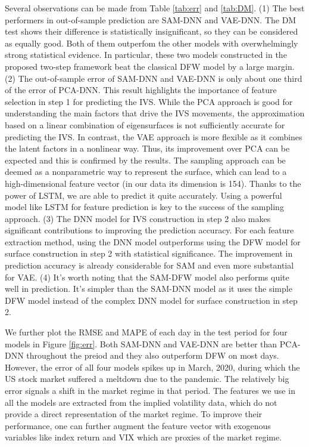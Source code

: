 \documentclass[11pt,a4paper]{article}
\theoremstyle{remark}
\begin{document}
Several observations can be made from Table \ref{tab:err} and \ref{tab:DM}. (1) The best performers in out-of-sample prediction are SAM-DNN and VAE-DNN. The DM test shows their difference is statistically insignificant, so they can be considered as equally good. Both of them outperfom the other models with overwhelmingly strong statistical evidence. In particular, these two models constructed in the proposed two-step framework beat the classical DFW model by a large margin. (2) The out-of-sample error of SAM-DNN and VAE-DNN is only about one third of the error of PCA-DNN. This result highlights the importance of feature selection in step 1 for predicting the IVS. While the PCA approach is good for understanding the main factors that drive the IVS movements, the approximation based on a linear combination of eigensurfaces is not sufficiently accurate for predicting the IVS. In contrast, the VAE approach is more flexible as it combines the latent factors in a nonlinear way. Thus, its improvement over PCA can be expected and this is confirmed by the results. The sampling approach can be deemed as a nonparametric way to represent the surface, which can lead to a high-dimensional feature vector (in our data its dimension is 154). Thanks to the power of LSTM, we are able to predict it quite accurately. Using a powerful model like LSTM for feature prediction is key to the success of the sampling approach. (3) The DNN model for IVS construction in step 2 also makes significant contributions to improving the prediction accuracy. For each feature extraction method, using the DNN model outperforms using the DFW model for surface construction in step 2 with statistical significance. The improvement in prediction accuracy is already considerable for SAM and even more substantial for VAE. (4) It's worth noting that the SAM-DFW model also performs quite well in prediction. It's simpler than the SAM-DNN model as it uses the simple DFW model instead of the complex DNN model for surface construction in step 2. 


We further plot the RMSE and MAPE of each day in the test period for four models in Figure \ref{fig:err}. Both SAM-DNN and VAE-DNN are better than PCA-DNN throughout the preiod and they also outperform DFW on most days. However, the error of all four models spikes up in March, 2020, during which the US stock market suffered a meltdown due to the pandemic. The relatively big error signals a shift in the market regime in that period. The features we use in all the models are extracted from the implied volatility data, which do not provide a direct representation of the market regime. To improve their performance, one can further augment the feature vector with exogenous variables like index return and VIX which are proxies of the market regime. 
\end{document}
